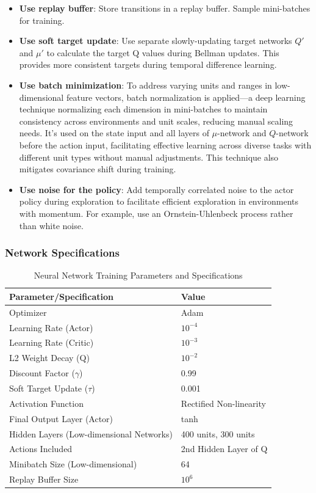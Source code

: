 \documentclass{article}
\begin{document}
\begin{itemize}
\item \textbf{Use replay buffer}: Store transitions in a replay buffer. Sample mini-batches for training.

\item \textbf{Use soft target update}: Use separate slowly-updating target networks $Q'$ and $\mu'$ to calculate the target Q values during Bellman updates. This provides more consistent targets during temporal difference learning.

\item \textbf{Use batch minimization}: To address varying units and ranges in low-dimensional feature vectors, batch normalization is applied—a deep learning technique normalizing each dimension in mini-batches to maintain consistency across environments and unit scales, reducing manual scaling needs. It's used on the state input and all layers of $\mu$-network and $Q$-network before the action input, facilitating effective learning across diverse tasks with different unit types without manual adjustments. This technique also mitigates covariance shift during training.

\item \textbf{Use noise for the policy}: Add temporally correlated noise to the actor policy during exploration to facilitate efficient exploration in environments with momentum. For example, use an Ornstein-Uhlenbeck process rather than white noise.
\end{itemize}

\subsubsection{Network Specifications}
\begin{table}[h!]
\centering
\begin{tabular}{l|l}
\textbf{Parameter/Specification} & \textbf{Value} \\
\hline
Optimizer & Adam \\
Learning Rate (Actor) & $10^{-4}$ \\
Learning Rate (Critic) & $10^{-3}$ \\
L2 Weight Decay (Q) & $10^{-2}$ \\
Discount Factor ($\gamma$) & 0.99 \\
Soft Target Update ($\tau$) & 0.001 \\
Activation Function & Rectified Non-linearity \\
Final Output Layer (Actor) & tanh \\
Hidden Layers (Low-dimensional Networks) & 400 units, 300 units \\
Actions Included & 2nd Hidden Layer of Q \\
Minibatch Size (Low-dimensional) & 64 \\
Replay Buffer Size & $10^6$ \\
\end{tabular}
\caption{Neural Network Training Parameters and Specifications}
\end{table}
\end{document}
